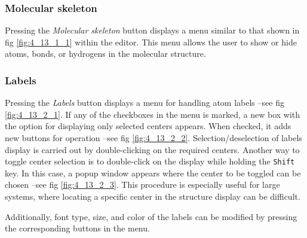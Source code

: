 \documentclass[10pt]{article}
\begin{document}
\vspace*{5mm}


\subsubsection{Molecular skeleton \label{sec:4.13.1}}

Pressing the {\it Molecular skeleton} button displays a menu similar to that shown in fig \ref{fig:4_13_1_1}  
within the editor. This menu allows the user to show or hide atoms, bonds, or hydrogens in the molecular structure.


\subsubsection{Labels \label{sec:4.13.2}}

Pressing the {\it Labels} button displays a menu for handling atom labels --see fig 
\ref{fig:4_13_2_1}. If any of the checkboxes in the menu is marked, a new box with the option
for displaying only selected centers appears. When checked, it adds new buttons for operation
--see fig \ref{fig:4_13_2_2}. Selection/deselection of labels display is carried out by double-clicking
on the required centers. Another way to toggle center selection is to double-click on the display while holding the \texttt{Shift} key. In this case, a popup window appears where
the center to be toggled can be chosen --see fig \ref{fig:4_13_2_3}. This procedure is
especially useful for large systems, where locating a specific center in the structure display
can be difficult.

Additionally, font type, size, and color of the labels can be modified by pressing the 
corresponding buttons in the menu.
\end{document}
